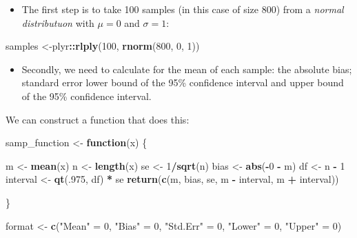 \documentclass[
]{book}
\newenvironment{Shaded}{\begin{snugshade}}{\end{snugshade}}
\newcommand{\ControlFlowTok}[1]{\textcolor[rgb]{0.13,0.29,0.53}{\textbf{#1}}}
\newcommand{\DecValTok}[1]{\textcolor[rgb]{0.00,0.00,0.81}{#1}}
\newcommand{\KeywordTok}[1]{\textcolor[rgb]{0.13,0.29,0.53}{\textbf{#1}}}
\newcommand{\NormalTok}[1]{#1}
\newcommand{\OperatorTok}[1]{\textcolor[rgb]{0.81,0.36,0.00}{\textbf{#1}}}
\newcommand{\StringTok}[1]{\textcolor[rgb]{0.31,0.60,0.02}{#1}}
\providecommand{\tightlist}{%
  \setlength{\itemsep}{0pt}\setlength{\parskip}{0pt}}
\begin{document}
\begin{itemize}
\tightlist
\item
  The first step is to take 100 samples (in this case of size 800) from a \emph{normal distributuon} with \(\mu = 0\) and \(\sigma = 1\):
\end{itemize}

\begin{Shaded}
\begin{Highlighting}[]
\NormalTok{samples <-plyr}\OperatorTok{::}\KeywordTok{rlply}\NormalTok{(}\DecValTok{100}\NormalTok{, }\KeywordTok{rnorm}\NormalTok{(}\DecValTok{800}\NormalTok{, }\DecValTok{0}\NormalTok{, }\DecValTok{1}\NormalTok{))}
\end{Highlighting}
\end{Shaded}

\begin{itemize}
\tightlist
\item
  Secondly, we need to calculate for the mean of each sample: the absolute bias; standard error lower bound of the 95\% confidence interval and upper bound of the 95\% confidence interval.
\end{itemize}

We can construct a function that does this:

\begin{Shaded}
\begin{Highlighting}[]
\NormalTok{samp_function <-}\StringTok{ }\ControlFlowTok{function}\NormalTok{(x) \{}
 
\NormalTok{  m <-}\StringTok{ }\KeywordTok{mean}\NormalTok{(x)}
\NormalTok{  n <-}\StringTok{ }\KeywordTok{length}\NormalTok{(x)}
\NormalTok{  se <-}\StringTok{ }\DecValTok{1}\OperatorTok{/}\KeywordTok{sqrt}\NormalTok{(n)}
\NormalTok{  bias <-}\StringTok{ }\KeywordTok{abs}\NormalTok{(}\OperatorTok{-}\DecValTok{0} \OperatorTok{-}\StringTok{ }\NormalTok{m)}
\NormalTok{  df <-}\StringTok{ }\NormalTok{n }\OperatorTok{-}\StringTok{ }\DecValTok{1}
\NormalTok{  interval <-}\StringTok{ }\KeywordTok{qt}\NormalTok{(.}\DecValTok{975}\NormalTok{, df) }\OperatorTok{*}\StringTok{ }\NormalTok{se}
  \KeywordTok{return}\NormalTok{(}\KeywordTok{c}\NormalTok{(m, bias, se, m }\OperatorTok{-}\StringTok{ }\NormalTok{interval, m }\OperatorTok{+}\StringTok{ }\NormalTok{interval))}

\NormalTok{\}}

\NormalTok{format <-}\StringTok{ }\KeywordTok{c}\NormalTok{(}\StringTok{"Mean"}\NormalTok{ =}\StringTok{ }\DecValTok{0}\NormalTok{, }\StringTok{"Bias"}\NormalTok{ =}\StringTok{ }\DecValTok{0}\NormalTok{, }\StringTok{"Std.Err"}\NormalTok{ =}\StringTok{ }\DecValTok{0}\NormalTok{, }\StringTok{"Lower"}\NormalTok{ =}\StringTok{ }\DecValTok{0}\NormalTok{, }\StringTok{"Upper"}\NormalTok{ =}\StringTok{ }\DecValTok{0}\NormalTok{)}
\end{Highlighting}
\end{Shaded}
\end{document}
